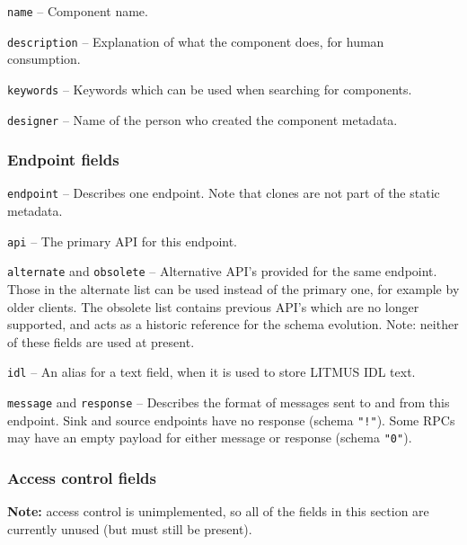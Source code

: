 \documentclass[12pt,a4paper,twoside]{article}
\renewcommand{\_}{\texttt{\symbol{95}}}
\begin{document}
\begin{bulletlist}
\item \verb^name^ -- Component name.
\item \verb^description^ -- Explanation of what the component does, for
		human consumption.
\item \verb^keywords^ -- Keywords which can be used when searching for
		components.
\item \verb^designer^ -- Name of the person who created the component metadata.
\end{bulletlist}

\subsubsection{Endpoint fields}

\begin{bulletlist}
\item \verb^endpoint^ -- Describes one endpoint. Note that clones
		are not part of the static metadata.
\item \verb^api^ -- The primary API for this endpoint.
\item \verb^alternate^ and \verb^obsolete^ -- Alternative API's provided
		for the same endpoint. Those in the alternate list can be used
		instead of the primary one, for example by older clients.
		The obsolete list contains previous API's which are no longer
		supported, and acts as a historic reference for the schema evolution.
		Note: neither of these fields are used at present.
\item \verb^idl^ -- An alias for a text field, when it is used to
		store LITMUS IDL text.
\item \verb^message^ and \verb^response^ -- Describes the format of
		messages sent to and from this endpoint.
		Sink and source endpoints have no response (schema \verb^"!"^).
		Some RPCs may have an empty payload for either message or response
		(schema \verb^"0"^).
\end{bulletlist}

\subsubsection{Access control fields}

\textbf{Note:} access control is unimplemented, so all of the fields in this
section are currently unused (but must still be present).
\end{document}
